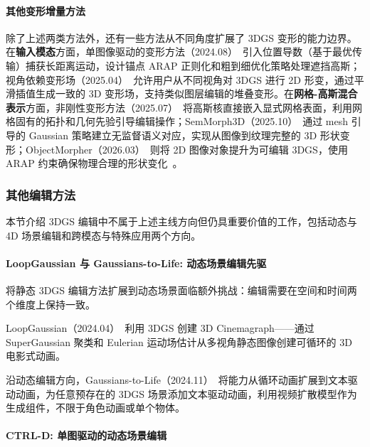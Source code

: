 \paragraph{其他变形增量方法}

除了上述两类方法外，还有一些方法从不同角度扩展了 3DGS 变形的能力边界。在\textbf{输入模态}方面，单图像驱动的变形方法（2024.08）~\cite{2408_07540}引入位置导数（基于最优传输）捕获长距离运动，设计锚点 ARAP 正则化和粗到细优化策略处理遮挡高斯；视角依赖变形场（2025.04）~\cite{2504_05544}允许用户从不同视角对 3DGS 进行 2D 形变，通过平滑插值生成一致的 3D 变形场，支持类似图层编辑的堆叠变形。在\textbf{网格-高斯混合表示}方面，非刚性变形方法（2025.07）~\cite{2507_07000}将高斯核直接嵌入显式网格表面，利用网格固有的拓扑和几何先验引导编辑操作；SemMorph3D（2025.10）~\cite{2510_02034}通过 mesh 引导的 Gaussian 策略建立无监督语义对应，实现从图像到纹理完整的 3D 形状变形；ObjectMorpher（2026.03）~\cite{2603_28152}则将 2D 图像对象提升为可编辑 3DGS，使用 ARAP 约束确保物理合理的形状变化~\cite{2504_05544,2604_01551}。

\subsubsection{其他编辑方法}

本节介绍 3DGS 编辑中不属于上述主线方向但仍具重要价值的工作，包括动态与 4D 场景编辑和跨模态与特殊应用两个方向。

\paragraph{LoopGaussian 与 Gaussians-to-Life: 动态场景编辑先驱}

将静态 3DGS 编辑方法扩展到动态场景面临额外挑战：编辑需要在空间和时间两个维度上保持一致。

LoopGaussian（2024.04）~\cite{2404_08966}利用 3DGS 创建 3D Cinemagraph——通过 SuperGaussian 聚类和 Eulerian 运动场估计从多视角静态图像创建可循环的 3D 电影式动画。

沿动态编辑方向，Gaussians-to-Life（2024.11）~\cite{2411_19233}将能力从循环动画扩展到文本驱动动画，为任意预存在的 3DGS 场景添加文本驱动动画，利用视频扩散模型作为生成组件，不限于角色动画或单个物体。

\paragraph{CTRL-D: 单图驱动的动态场景编辑}

